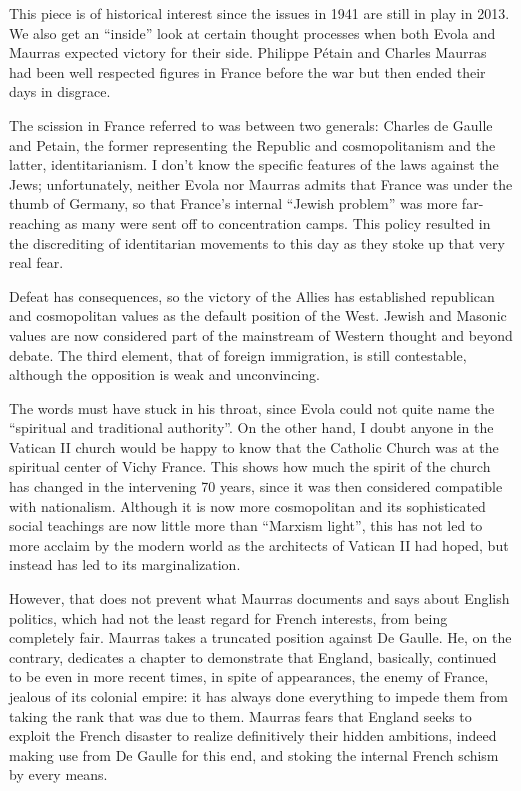 \begin{quotationx}
This piece is of historical interest since the issues in 1941 are still in play in 2013. We also get an ``inside'' look at certain thought processes when both Evola and Maurras expected victory for their side. Philippe Pétain and Charles Maurras had been well respected figures in France before the war but then ended their days in disgrace.

The scission in France referred to was between two generals: Charles de Gaulle and Petain, the former representing the Republic and cosmopolitanism and the latter, identitarianism. I don't know the specific features of the laws against the Jews; unfortunately, neither Evola nor Maurras admits that France was under the thumb of Germany, so that France's internal ``Jewish problem'' was more far-reaching as many were sent off to concentration camps. This policy resulted in the discrediting of identitarian movements to this day as they stoke up that very real fear.

Defeat has consequences, so the victory of the Allies has established republican and cosmopolitan values as the default position of the West. Jewish and Masonic values are now considered part of the mainstream of Western thought and beyond debate. The third element, that of foreign immigration, is still contestable, although the opposition is weak and unconvincing.

The words must have stuck in his throat, since Evola could not quite name the ``spiritual and traditional authority''. On the other hand, I doubt anyone in the Vatican II church would be happy to know that the Catholic Church was at the spiritual center of Vichy France. This shows how much the spirit of the church has changed in the intervening 70 years, since it was then considered compatible with nationalism. Although it is now more cosmopolitan and its sophisticated social teachings are now little more than ``Marxism light'', this has not led to more acclaim by the modern world as the architects of Vatican II had hoped, but instead has led to its marginalization.
\end{quotationx}


However, that does not prevent what Maurras documents and says about English politics, which had not the least regard for French interests, from being completely fair. Maurras takes a truncated position against De Gaulle. He, on the contrary, dedicates a chapter to demonstrate that England, basically, continued to be even in more recent times, in spite of appearances, the enemy of France, jealous of its colonial empire: it has always done everything to impede them from taking the rank that was due to them. Maurras fears that England seeks to exploit the French disaster to realize definitively their hidden ambitions, indeed making use from De Gaulle for this end, and stoking the internal French schism by every means.

